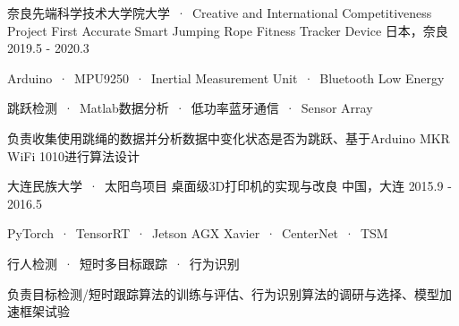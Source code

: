 

\begin{cventries}
  
  \cventryproject 
    {奈良先端科学技术大学院大学\ ·\ Creative and International Competitiveness Project}%
    {First Accurate Smart Jumping Rope Fitness Tracker Device} %
    {日本，奈良} %
    {2019.5 - 2020.3} %
    {
      \begin{cvitems} %
        \item {Arduino\ ·\ MPU9250\ ·\ Inertial Measurement Unit\ ·\ Bluetooth Low Energy}
        \item {跳跃检测\ ·\ Matlab数据分析\ ·\ 低功率蓝牙通信\ ·\ Sensor Array}
        \item {负责收集使用跳绳的数据并分析数据中变化状态是否为跳跃、基于Arduino MKR WiFi 1010进行算法设计}
      \end{cvitems}
    }
    
  \cventryproject 
    {大连民族大学\ ·\ 太阳鸟项目}%
    {桌面级3D打印机的实现与改良} %
    {中国，大连} %
    {2015.9 - 2016.5} %
    {
      \begin{cvitems} %
        \item {PyTorch\ ·\ TensorRT\ ·\ Jetson AGX Xavier\ ·\ CenterNet\ ·\ TSM}
        \item {行人检测\ ·\ 短时多目标跟踪\ ·\ 行为识别}
        \item {负责目标检测/短时跟踪算法的训练与评估、行为识别算法的调研与选择、模型加速框架试验}
      \end{cvitems}
    }

\end{cventries}
